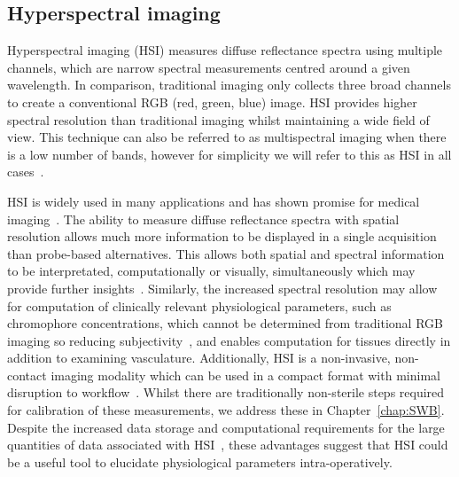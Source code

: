 \subsection{Hyperspectral imaging}\label{sec:introHSI}
Hyperspectral imaging (HSI) measures diffuse reflectance spectra using multiple channels, which are narrow spectral measurements centred around a given wavelength. In comparison, traditional imaging only collects three broad channels to create a conventional RGB (red, green, blue) image. HSI provides higher spectral resolution than traditional imaging whilst maintaining a wide field of view. This technique can also be referred to as multispectral imaging when there is a low number of bands, however for simplicity we will refer to this as HSI in all cases~\citep{Clancy2020}. 

HSI is widely used in many applications and has shown promise for medical imaging~\citep{Lu2014,Giannoni2018,Calin2014,Shapey2019}. The ability to measure diffuse reflectance spectra with spatial resolution allows much more information to be displayed in a single acquisition than probe-based alternatives. This allows both spatial and spectral information to be interpretated, computationally or visually, simultaneously which may provide further insights~\citep{Seidlitz2022}. Similarly, the increased spectral resolution may allow for computation of clinically relevant physiological parameters, such as chromophore concentrations, which cannot be determined from traditional RGB imaging so reducing subjectivity~\citep{Seidlitz2022}, and enables computation for tissues directly in addition to examining vasculature. Additionally, HSI is a non-invasive, non-contact imaging modality which can be used in a compact format with minimal disruption to workflow~\citep{Thoenissen2023, Ebner2021, MacCormac2023}. Whilst there are traditionally non-sterile steps required for calibration of these measurements, we address these in Chapter~\ref{chap:SWB}. Despite the increased data storage and computational requirements for the large quantities of data associated with HSI~\citep{Altamimi2022}, these advantages suggest that HSI could be a useful tool to elucidate physiological parameters intra-operatively. 

